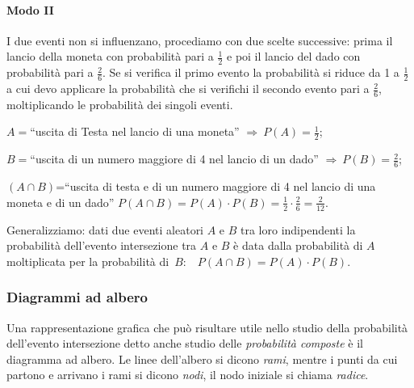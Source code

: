 \begin{exrig}
\begin{esempio}
\paragraph{Modo II} I due eventi non si influenzano, procediamo con due scelte successive: prima il lancio della moneta con probabilità pari a $\frac 1 2$ e poi il lancio del dado con probabilità pari a $\frac 2 6$. Se si verifica il primo evento la probabilità si riduce da 1 a $\frac 1 2$ a cui devo applicare la probabilità che si verifichi il secondo evento pari a $\frac 2 6$, moltiplicando le probabilità dei singoli eventi.
\begin{description*}
\item $A=$``uscita di Testa nel lancio di una moneta'' $\Rightarrow\: P(A)=\frac 1 2$;
\item $B=$``uscita di un numero maggiore di 4 nel lancio di un dado'' $\Rightarrow\: P(B)=\frac 2 6$;
\item $(A\cap B)$=``uscita di testa e di un numero maggiore di 4 nel lancio di una moneta e di un dado'' $P(A\cap B)=P(A)\cdot P(B)=\frac 1 2\cdot \frac 2 6=\frac 2{12}$.
\end{description*}
\end{esempio}
\end{exrig}

Generalizziamo: dati due eventi aleatori $A$ e $B$ tra loro indipendenti la probabilità dell'evento intersezione tra $A$ e $B$ è data dalla probabilità di $A$ moltiplicata per la probabilità di~$B$:~~$P(A\cap B)=P(A)\cdot P(B).$\label{reg:probabilita_intersezione_eventi_indipendenti}

\subsubsection*{Diagrammi ad albero}
Una rappresentazione grafica che può risultare utile nello studio della probabilità dell'evento intersezione detto anche studio delle \emph{probabilità composte} è il diagramma ad albero. Le linee dell'albero si dicono \emph{rami}, mentre i punti da cui partono e arrivano i rami si dicono \emph{nodi}, il nodo iniziale si chiama \emph{radice}.


